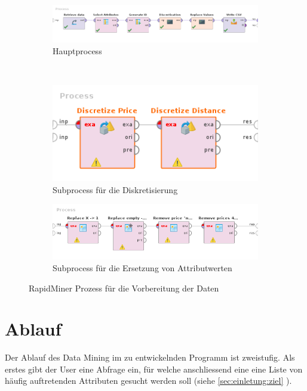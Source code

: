 \begin{figure}[htb]
	\begin{subfigure}[t]{1\textwidth}
		\centering
		\includegraphics[width=1\textwidth]{images/rapidminer-process}
		\caption{Hauptprocess}
		\label{fig:recherche:rapidminer:1:1}
	\end{subfigure} \\
	\begin{subfigure}[t]{0.5\textwidth}
		\centering
		\includegraphics[width=1\textwidth]{images/rapidminer-process-discretization}
		\caption{Subprocess für die Diskretisierung}
		\label{fig:recherche:rapidminer:1:2}
	\end{subfigure}
	\begin{subfigure}[t]{0.8\textwidth}
		\centering
		\includegraphics[width=1\textwidth]{images/rapidminer-process-replace-values}
		\caption{Subprocess für die Ersetzung von Attributwerten}
		\label{fig:recherche:rapidminer:1:3}
	\end{subfigure}
	\caption{RapidMiner Prozess für die Vorbereitung der Daten}
	\label{fig:recherche:rapidminer:1}
\end{figure}

\section{Ablauf}
Der Ablauf des Data Mining im zu entwickelnden Programm ist zweistufig. Als erstes gibt der User eine Abfrage ein, für welche anschliessend eine eine Liste von häufig auftretenden Attributen gesucht werden soll (siehe \cref{sec:einletung:ziel} ).


